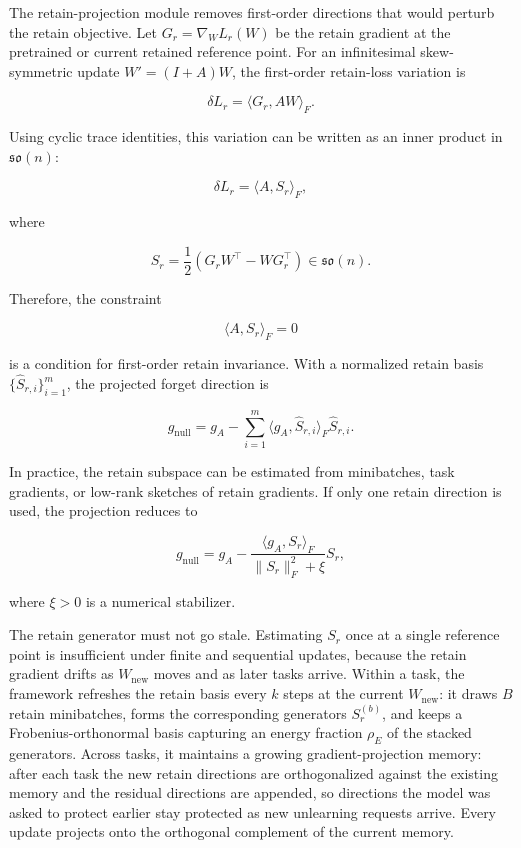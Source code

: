 \documentclass[
]{article}
\begin{document}
The retain-projection module removes first-order directions that would perturb the retain objective. Let \(G_r=\nabla_W L_r(W)\) be the retain gradient at the pretrained or current retained reference point. For an infinitesimal skew-symmetric update \(W'=(I+A)W\), the first-order retain-loss variation is

\[
\delta L_r=\langle G_r,AW\rangle_F.
\]

Using cyclic trace identities, this variation can be written as an inner product in \(\mathfrak{so}(n)\):

\[
\delta L_r=\langle A,S_r\rangle_F,
\]

where

\[
S_r=\frac{1}{2}(G_rW^\top-WG_r^\top)\in\mathfrak{so}(n).
\]

Therefore, the constraint

\[
\langle A,S_r\rangle_F=0
\]

is a condition for first-order retain invariance. With a normalized retain basis \(\{\widehat{S}_{r,i}\}_{i=1}^m\), the projected forget direction is

\[
g_{\mathrm{null}}
=g_A-\sum_{i=1}^{m}\langle g_A,\widehat{S}_{r,i}\rangle_F\widehat{S}_{r,i}.
\]

In practice, the retain subspace can be estimated from minibatches, task gradients, or low-rank sketches of retain gradients. If only one retain direction is used, the projection reduces to

\[
g_{\mathrm{null}}
=g_A-
\frac{\langle g_A,S_r\rangle_F}{\|S_r\|_F^2+\xi}S_r,
\]

where \(\xi>0\) is a numerical stabilizer.

The retain generator must not go stale. Estimating \(S_r\) once at a single reference point is insufficient under finite and sequential updates, because the retain gradient drifts as \(W_{\mathrm{new}}\) moves and as later tasks arrive. Within a task, the framework refreshes the retain basis every \(k\) steps at the current \(W_{\mathrm{new}}\): it draws \(B\) retain minibatches, forms the corresponding generators \(S_r^{(b)}\), and keeps a Frobenius-orthonormal basis capturing an energy fraction \(\rho_E\) of the stacked generators. Across tasks, it maintains a growing gradient-projection memory: after each task the new retain directions are orthogonalized against the existing memory and the residual directions are appended, so directions the model was asked to protect earlier stay protected as new unlearning requests arrive. Every update projects onto the orthogonal complement of the current memory.
\end{document}
